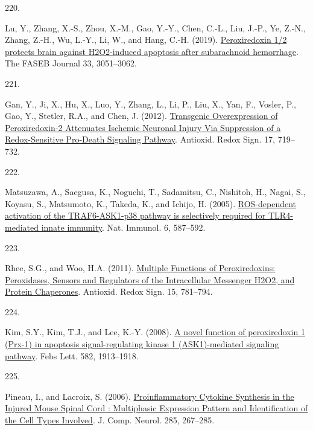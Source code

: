 \documentclass[
]{article}
\newlength{\cslhangindent}
\newlength{\csllabelwidth}
\newlength{\cslentryspacingunit} %
\newenvironment{CSLReferences}[2] %
 {%
  \setlength{\parindent}{0pt}
  \ifodd #1
  \let\oldpar\par
  \def\par{\hangindent=\cslhangindent\oldpar}
  \fi
  \setlength{\parskip}{#2\cslentryspacingunit}
 }%
 {}
\newcommand{\CSLLeftMargin}[1]{\parbox[t]{\csllabelwidth}{#1}}
\newcommand{\CSLRightInline}[1]{\parbox[t]{\linewidth - \csllabelwidth}{#1}\break}
\begin{document}
\begin{CSLReferences}{0}{0}
\leavevmode{}%
\CSLLeftMargin{220. }
\CSLRightInline{Lu, Y., Zhang, X.-S., Zhou, X.-M., Gao, Y.-Y., Chen, C.-L., Liu, J.-P., Ye, Z.-N., Zhang, Z.-H., Wu, L.-Y., Li, W., and Hang, C.-H. (2019). \href{https://doi.org/10.1096/fj.201801150R}{Peroxiredoxin 1/2 protects brain against {H2O2-induced} apoptosis after subarachnoid hemorrhage}. The FASEB Journal 33, 3051--3062.}

\leavevmode{}%
\CSLLeftMargin{221. }
\CSLRightInline{Gan, Y., Ji, X., Hu, X., Luo, Y., Zhang, L., Li, P., Liu, X., Yan, F., Vosler, P., Gao, Y., Stetler, R.A., and Chen, J. (2012). \href{https://doi.org/10.1089/ars.2011.4298}{Transgenic {Overexpression} of {Peroxiredoxin-2 Attenuates Ischemic Neuronal Injury Via Suppression} of a {Redox-Sensitive Pro-Death Signaling Pathway}}. Antioxid. Redox Sign. 17, 719--732.}

\leavevmode{}%
\CSLLeftMargin{222. }
\CSLRightInline{Matsuzawa, A., Saegusa, K., Noguchi, T., Sadamitsu, C., Nishitoh, H., Nagai, S., Koyasu, S., Matsumoto, K., Takeda, K., and Ichijo, H. (2005). \href{https://doi.org/10.1038/ni1200}{{ROS-dependent} activation of the {TRAF6-ASK1-p38} pathway is selectively required for {TLR4-mediated} innate immunity}. Nat. Immunol. 6, 587--592.}

\leavevmode{}%
\CSLLeftMargin{223. }
\CSLRightInline{Rhee, S.G., and Woo, H.A. (2011). \href{https://doi.org/10.1089/ars.2010.3393}{Multiple {Functions} of {Peroxiredoxins}: {Peroxidases}, {Sensors} and {Regulators} of the {Intracellular Messenger H2O2}, and {Protein Chaperones}}. Antioxid. Redox Sign. 15, 781--794.}

\leavevmode{}%
\CSLLeftMargin{224. }
\CSLRightInline{Kim, S.Y., Kim, T.J., and Lee, K.-Y. (2008). \href{https://doi.org/10.1016/j.febslet.2008.05.015}{A novel function of peroxiredoxin 1 ({Prx-1}) in apoptosis signal-regulating kinase 1 ({ASK1})-mediated signaling pathway}. Febs Lett. 582, 1913--1918.}

\leavevmode{}%
\CSLLeftMargin{225. }
\CSLRightInline{Pineau, I., and Lacroix, S. (2006). \href{https://doi.org/10.1002/cne.21149}{Proinflammatory {Cytokine Synthesis} in the {Injured Mouse Spinal Cord} : {Multiphasic Expression Pattern} and {Identification} of the {Cell Types Involved}}. J. Comp. Neurol. 285, 267--285.}


\end{CSLReferences}
\end{document}
